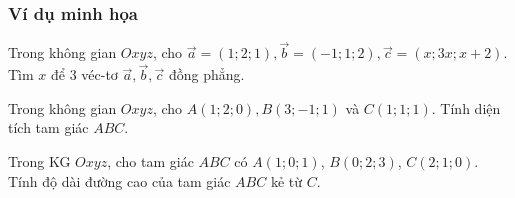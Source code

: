 \subsubsection{Ví dụ minh họa}
\begin{vd}%
	Trong không gian $ Oxyz $, cho $ \vec{a} = (1;2;1), \vec{b} = (-1;1;2), \vec{c} = (x;3x;x+2) $. Tìm $x$ để  $ 3 $ véc-tơ $ \vec{a}, \vec{b}, \vec{c} $ đồng phẳng.	
\end{vd}
\begin{vd}%
	Trong không gian $ Oxyz $, cho $ A(1;2;0), B(3;-1;1) $	và $ C(1;1;1) $. Tính diện tích tam giác $ ABC $.
\end{vd}
\begin{vd}%
	Trong KG $Oxyz$, cho tam giác $ABC$ có $A\left(1;0;1\right)$, $B\left(0;2;3\right)$, $C\left(2;1;0\right)$. Tính độ dài đường cao của tam giác $ABC$ kẻ từ $C$.
\end{vd}


